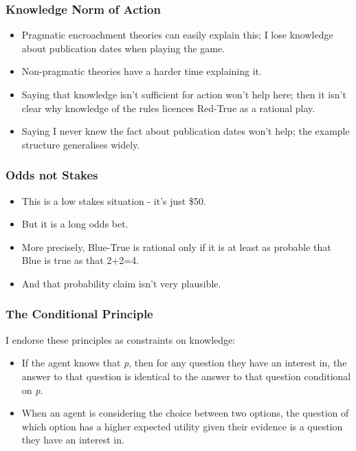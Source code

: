\begin{frame}

\frametitle{Knowledge Norm of Action}
\label{knowledgenormofaction}

\begin{itemize}
\item Pragmatic encroachment theories can easily explain this; I lose knowledge about publication dates when playing the game.

\item Non-pragmatic theories have a harder time explaining it.

\item Saying that knowledge isn't sufficient for action won't help here; then it isn't clear why knowledge of the rules licences Red-True as a rational play.

\item Saying I never knew the fact about publication dates won't help; the example structure generalises widely.

\end{itemize}

\end{frame}

\begin{frame}

\frametitle{Odds not Stakes}
\label{oddsnotstakes}

\begin{itemize}
\item This is a low stakes situation - it's just \$50.

\item But it is a long odds bet.

\item More precisely, Blue-True is rational only if it is at least as probable that Blue is true as that 2+2=4.

\item And that probability claim isn't very plausible.

\end{itemize}

\end{frame}

\begin{frame}

\frametitle{The Conditional Principle}
\label{theconditionalprinciple}

I endorse these principles as constraints on knowledge:

\begin{itemize}
\item If the agent knows that \emph{p}, then for any question they have an interest in, the answer to that question is identical to the answer to that question conditional on \emph{p}.

\item When an agent is considering the choice between two options, the question of which option has a higher expected utility given their evidence is a question they have an interest in.

\end{itemize}

\end{frame}

